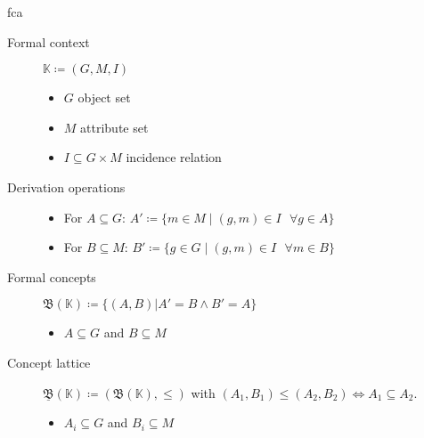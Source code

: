 \begin{frame}{\acf{fca}~\parencite{fca-book}} 
    
\begin{description}
    \item[Formal context] $\mathbb{K} \coloneq (G, M, I)$
    \begin{itemize}
        \item $G$ object set
        \item $M$ attribute set
        \item $I \subseteq G \times M$ incidence relation
    \end{itemize}
\item [Derivation operations] \text{ }
\begin{itemize}
    \item For $A \subseteq G $: $A' \coloneq \{m \in M \mid (g, m) \in I \text{ } \forall g \in A \}$
    \item For $B \subseteq M $: $B' \coloneq \{g \in G \mid (g, m) \in I \text{ } \forall m \in B\}$
\end{itemize}
\item [Formal concepts] $\mathfrak{B}(\mathbb{K}) \coloneq \{(A,B) | A' = B \land B' = A \}$ 
\begin{itemize}
    \item $A \subseteq G$ and $B \subseteq M$
\end{itemize} 
\item [Concept lattice] $\underline{\mathfrak{B}}(\mathbb{K}) \coloneq (\mathfrak{B}(\mathbb{K}), \leq)$ with $(A_1, B_1) \leq (A_2, B_2) \iff A_1 \subseteq A_2$.
\begin{itemize}
    \item $A_i \subseteq G$ and $B_i \subseteq M$
\end{itemize} 
\end{description}
\end{frame}
